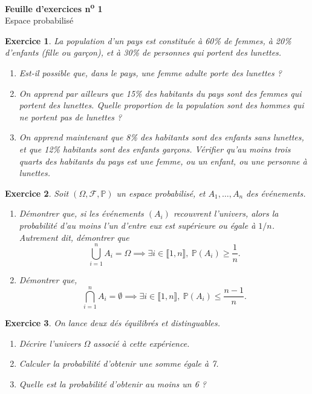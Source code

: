 \documentclass[12pt,a4paper]{article}
\newcommand{\1}{\mathds{1}}
\numberwithin{theorem}{section}					%
\newtheorem{exercice}{Exercice}
\theoremstyle{definition}						%
\newcommand{\intervalle}[2]{\llbracket #1,#2 \rrbracket}
\renewcommand{\P}{\mathbb{P}}
\renewcommand{\leq}{\leqslant}   %
\renewcommand{\geq}{\geqslant}   %
\begin{document}
\begin{center}{\Large\bfseries Feuille d'exercices n\textsuperscript{o} 1}\\[.2em]{\large Espace probabilisé}\end{center}


\begin{exercice}
    La population d'un pays est constituée à 60\% de femmes, à 20\% d'enfants (fille ou
garçon), et à 30\% de personnes qui portent des lunettes.
\begin{enumerate}
    \item Est-il possible que, dans le pays, une femme adulte porte des lunettes ?
    \item On apprend par ailleurs que 15\% des habitants du pays sont des femmes qui
portent des lunettes. Quelle proportion de la population sont des hommes qui ne portent
pas de lunettes ?
     \item On apprend maintenant que 8\% des habitants sont des enfants sans lunettes,
et que 12\% habitants sont des enfants garçons. Vérifier qu'au moins trois quarts des
habitants du pays est une femme, ou un enfant, ou une personne à lunettes.
\end{enumerate} 
\end{exercice}
\vspace{0.15cm}


\begin{exercice}
Soit $(\Omega, \mathcal{F}, \P)$ un espace probabilisé, et $A_1, \dots, A_n$ des
événements.
\begin{enumerate}
    \item Démontrer que, si les événements $(A_i)$ recouvrent l'univers, alors la
probabilité d'au moins l'un d'entre eux est supérieure ou égale à $1/n$. Autrement dit,
démontrer que
\[ \bigcup_{i=1}^{n} A_i = \Omega \implies \exists i \in \intervalle{1}{n},\ \P(A_i) \geq
   \frac{1}{n}. \]
   \item Démontrer que,
\[ \bigcap_{i=1}^{n} A_i = \emptyset \implies \exists i \in \intervalle{1}{n},\ \P(A_i) \leq
   \frac{n - 1}{n}. \]
\end{enumerate}
\end{exercice}

\begin{exercice}
On lance deux dés équilibrés et distinguables.
\begin{enumerate}
    \item Décrire l'univers $\Omega$ associé à cette expérience.
    \item Calculer la probabilité d'obtenir une somme égale à 7.
    \item Quelle est la probabilité d'obtenir au moins un 6 ?
\end{enumerate}
\end{exercice}
\end{document}
